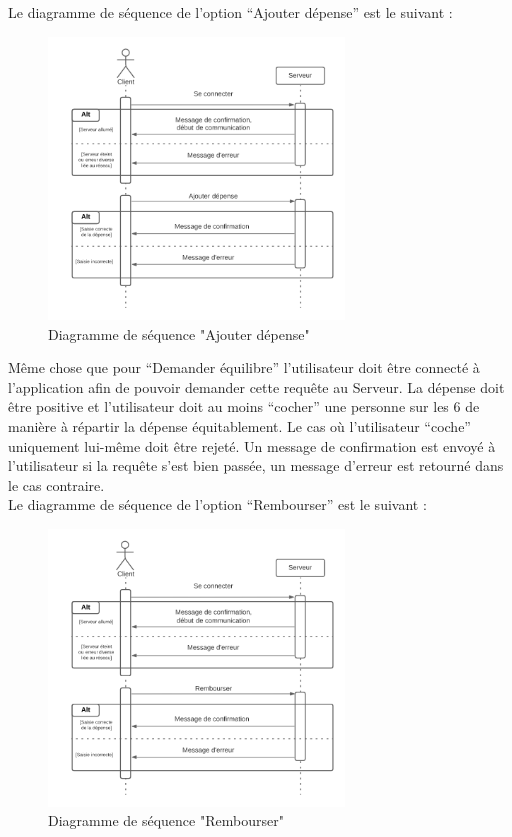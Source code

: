 \documentclass[12,french]{report}
\begin{document}
Le diagramme de séquence de l’option “Ajouter dépense” est le suivant :\\

\begin{figure}[H]
	\center
	\includegraphics[width=0.7\textwidth]{./Images_pooa/Sequence_2}
	\caption{Diagramme de séquence "Ajouter dépense"}
\end{figure}\vspace{0.2cm}

Même chose que pour “Demander équilibre” l’utilisateur doit être connecté à l’application afin de pouvoir demander cette requête au Serveur. La dépense doit être positive et l’utilisateur doit au moins “cocher” une personne sur les 6 de manière à répartir la dépense équitablement. Le cas où l’utilisateur “coche” uniquement lui-même doit être rejeté. Un message de confirmation est envoyé à l’utilisateur si la requête s’est bien passée, un message d’erreur est retourné dans le cas contraire.\\

Le diagramme de séquence de l’option “Rembourser” est le suivant :\\

\begin{figure}[H]
	\center
	\includegraphics[width=0.7\textwidth]{./Images_pooa/Sequence_3}
	\caption{Diagramme de séquence "Rembourser"}
\end{figure}\vspace{0.2cm}
\end{document}
